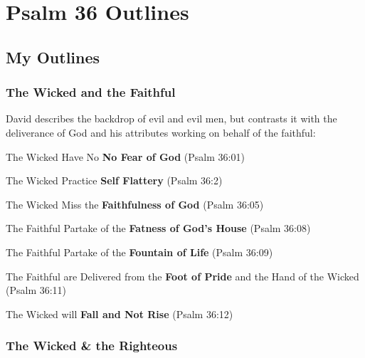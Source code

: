 \section{Psalm 36 Outlines}

\subsection{My Outlines}

\subsubsection{The Wicked and the Faithful}
David describes the backdrop of evil and evil men, but contrasts it with the deliverance of God and his attributes working on behalf of the faithful:
\begin{compactenum}[I.]
    \item The Wicked Have No \textbf{No Fear of God} (Psalm 36:01)
    \item The Wicked Practice \textbf{Self Flattery} (Psalm 36:2)
    \item The Wicked Miss the \textbf{Faithfulness of God}  (Psalm 36:05)
    \item The Faithful Partake of the \textbf{Fatness of God's House}  (Psalm 36:08)
    \item The Faithful Partake of the \textbf{Fountain of Life}  (Psalm 36:09)
    \item The Faithful are Delivered from the \textbf{Foot of Pride} and the Hand of the Wicked  (Psalm 36:11)
    \item The Wicked will \textbf{Fall and Not Rise}  (Psalm 36:12)\end{compactenum}


\subsubsection{The Wicked \& the Righteous}

